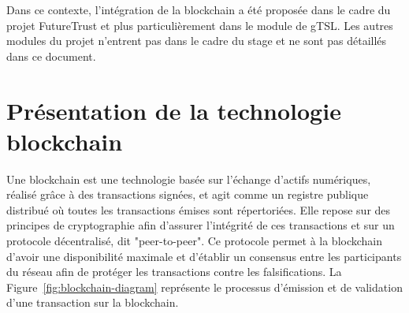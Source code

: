 \documentclass{tnreport}
\begin{document}
Dans ce contexte, l'intégration de la blockchain a été proposée dans le cadre du projet FutureTrust et plus particulièrement dans le module de gTSL. Les autres modules du projet n'entrent pas dans le cadre du stage et ne sont pas détaillés dans ce document. 

\section{Présentation de la technologie blockchain}

Une blockchain est une technologie basée sur l'échange d'actifs numériques, réalisé grâce à des transactions signées, et agit comme un registre publique distribué où toutes les transactions émises sont répertoriées. Elle repose sur des principes de cryptographie afin d'assurer l'intégrité de ces transactions et sur un protocole décentralisé, dit "peer-to-peer". Ce protocole permet à la blockchain d'avoir une disponibilité maximale et d'établir un consensus entre les participants du réseau afin de protéger les transactions contre les falsifications. La Figure~\ref{fig:blockchain-diagram} représente le processus d'émission et de validation d'une transaction sur la blockchain.
\end{document}
